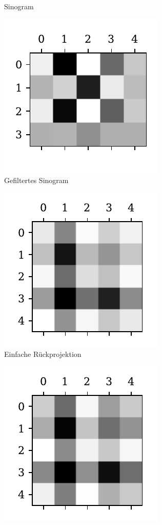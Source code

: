 \documentclass[slug=PET, room=Andreas-Schubert-Bau\,\ 424A, supervisor=Carsten\ Bittrich, coursedate=10.\ 01.\ 2020]{../../Lab_Report_LaTeX/lab_report}
\begin{document}
\begin{figure}[htp]
\begin{subfigure}[t]{.25\textwidth}
    \caption{Sinogram}
    \label{fig:theory-projection}
  \end{subfigure}
  \begin{subfigure}[t]{.25\textwidth}
    \centering
    \includegraphics[width=.6\textwidth]{../auswertung/figs/theory/convoluted.pdf}
    \caption{Gefiltertes Sinogram}
    \label{fig:theory-convoluted}
  \end{subfigure}
  \begin{subfigure}[t]{.25\textwidth}
    \centering
    \includegraphics[width=.6\textwidth]{../auswertung/figs/theory/rec_simple.pdf}
    \caption{Einfache R\"uckprojektion}
    \label{fig:theory-rec_simple}
  \end{subfigure}
  \begin{subfigure}[t]{.25\textwidth}
    \centering
    \includegraphics[width=.6\textwidth]{../auswertung/figs/theory/rec_filtered.pdf}

\end{subfigure}
\end{figure}
\end{document}
